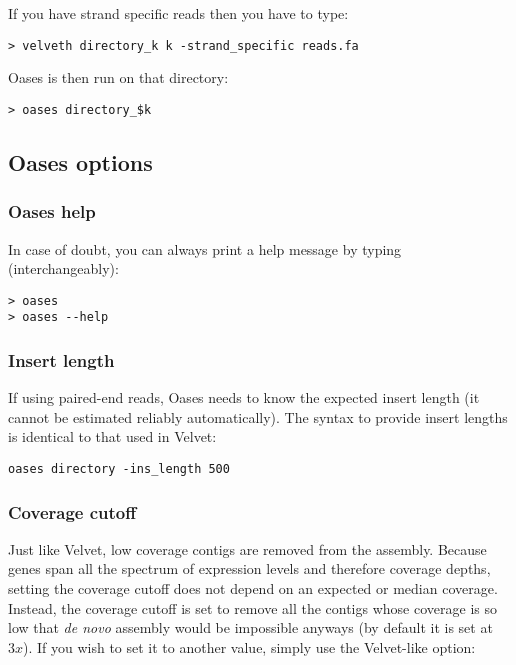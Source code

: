 \documentclass[12pt]{article}
\begin{document}
If you have strand specific reads then you have to type:
\begin{verbatim}
> velveth directory_k k -strand_specific reads.fa
\end{verbatim}

Oases is then run on that directory:

\begin{verbatim}
> oases directory_$k
\end{verbatim}

\subsection{Oases options}

\subsubsection{Oases help}

In case of doubt, you can always print a help message by typing (interchangeably):

\begin{verbatim}
> oases
> oases --help
\end{verbatim}

\subsubsection{Insert length}\label{insert}

If using paired-end reads, Oases needs to know the expected insert length (it cannot be estimated reliably automatically). The syntax to provide insert lengths is identical to that used in Velvet:

\begin{verbatim}
oases directory -ins_length 500
\end{verbatim}

\subsubsection{Coverage cutoff}

Just like Velvet, low coverage contigs are removed from the assembly. Because genes span all the spectrum of expression levels and therefore coverage depths, setting the coverage cutoff does not depend on an expected or median coverage. Instead, the coverage cutoff is set to remove all the contigs whose coverage is so low that \emph{de novo} assembly would be impossible anyways (by default it is set at $3x$). If you wish to set it to another value, simply use the Velvet-like option:
\end{document}
